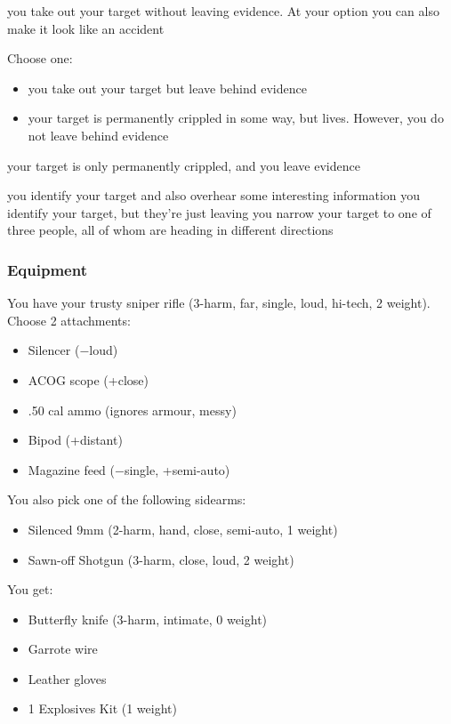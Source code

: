 {you take out your target without leaving evidence. At your option you can also make it look like an accident}
{Choose one:
\begin{itemize}
\item you take out your target but leave behind evidence
\item your target is permanently crippled in some way, but lives. However, you do not leave behind evidence
\end{itemize}}
{your target is only permanently crippled, and you leave evidence}

{you identify your target and also overhear some interesting information}
{you identify your target, but they're just leaving}
{you narrow your target to one of three people, all of whom are heading in different directions}


\subsubsection{Equipment}

You have your trusty sniper rifle (3-harm, far, single, loud, hi-tech, 2 weight). Choose 2 attachments:
\begin{itemize}
\item Silencer ($-$loud)
\item ACOG scope (+close)
\item .50 cal ammo (ignores armour, messy)
\item Bipod (+distant)
\item Magazine feed ($-$single, +semi-auto)
\end{itemize}

You also pick one of the following sidearms:
\begin{itemize}
\item Silenced 9mm (2-harm, hand, close, semi-auto, 1 weight)
\item Sawn-off Shotgun (3-harm, close, loud, 2 weight)
\end{itemize}

You get:
\begin{itemize}
\item Butterfly knife (3-harm, intimate, 0 weight)
\item Garrote wire
\item Leather gloves
\item 1 Explosives Kit (1 weight)
\end{itemize}

